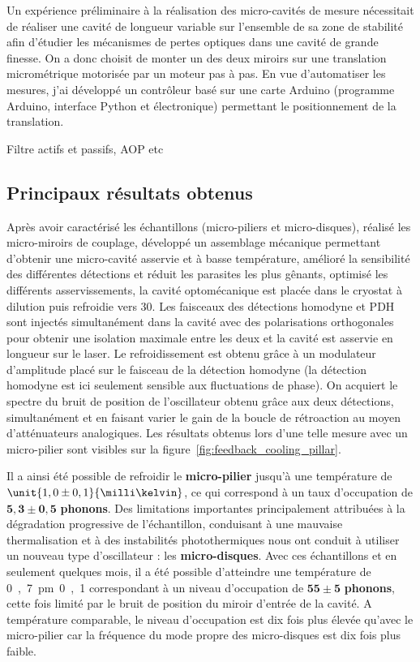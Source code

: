 \documentclass[12pt,a4paper]{article}
\begin{document}
Un expérience préliminaire à la réalisation des micro-cavités de mesure nécessitait de réaliser une cavité de longueur variable sur l'ensemble de sa zone de stabilité afin d'étudier les mécanismes de pertes optiques dans une cavité de grande finesse.
On a donc choisit de monter un des deux miroirs sur une translation micrométrique motorisée par un moteur pas à pas.
En vue d'automatiser les mesures, j'ai développé un contrôleur basé sur une carte Arduino (programme Arduino, interface Python et électronique) permettant le positionnement de la translation.

Filtre actifs et passifs, AOP etc

\subsection{Principaux résultats obtenus}

Après avoir caractérisé les échantillons (micro-piliers et micro-disques), réalisé les micro-miroirs de couplage, développé un assemblage mécanique permettant d'obtenir une micro-cavité asservie et à basse température, amélioré la sensibilité des différentes détections et réduit les parasites les plus gênants, optimisé les différents asservissements, la cavité optomécanique est placée dans le cryostat à dilution puis refroidie vers \unit{30}{\milli\kelvin}.
Les faisceaux des détections homodyne et PDH sont injectés simultanément dans la cavité avec des polarisations orthogonales pour obtenir une isolation maximale entre les deux et la cavité est asservie en longueur sur le laser.
Le refroidissement est obtenu grâce à un modulateur d'amplitude placé sur le faisceau de la détection homodyne (la détection homodyne est ici seulement sensible aux fluctuations de phase).
On acquiert le spectre du bruit de position de l'oscillateur obtenu grâce aux deux détections, simultanément et en faisant varier le gain de la boucle de rétroaction au moyen d'atténuateurs analogiques.
Les résultats obtenus lors d'une telle mesure avec un micro-pilier sont visibles sur la figure~\ref{fig:feedback_cooling_pillar}.

Il a ainsi été possible de refroidir le \textbf{micro-pilier} jusqu'à une température de $\unit{1,0\pm 0,1}{\milli\kelvin}$, ce qui correspond à un taux d'occupation de $\mathbf{5,3 \pm 0,5}$ \textbf{phonons}.
Des limitations importantes principalement attribuées à la dégradation progressive de l'échantillon, conduisant à une mauvaise thermalisation et à des instabilités photothermiques nous ont conduit à utiliser un nouveau type d'oscillateur : les \textbf{micro-disques}.
Avec ces échantillons et en seulement quelques mois, il a été possible d'atteindre une température de \unit{0,7\pm 0,1}{\milli\kelvin} correspondant à un niveau d'occupation de $\mathbf{55\pm5}$ \textbf{phonons}, cette fois limité par le bruit de position du miroir d'entrée de la cavité.
A température comparable, le niveau d'occupation est dix fois plus élevée qu'avec le micro-pilier car la fréquence du mode propre des micro-disques est dix fois plus faible. 
\end{document}
